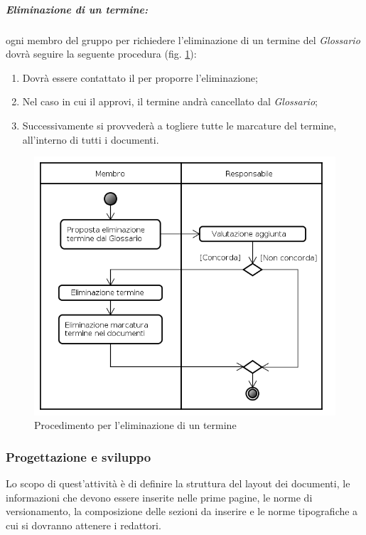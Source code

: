 \subparagraph{Eliminazione di un termine:}
ogni membro del gruppo per richiedere l'eliminazione di un termine del \emph{Glossario} dovrà seguire la seguente procedura (fig. \ref{proc_eliminazione}):
\begin{enumerate}
\item Dovrà essere contattato il \projectManager{} per proporre l'eliminazione;
\item Nel caso in cui il \projectManager{} approvi, il termine andrà cancellato dal \emph{Glossario};
\item Successivamente si provvederà a togliere tutte le marcature del termine, all'interno di tutti i documenti.
\end{enumerate}
\pagebreak
\begin{figure}[!h]
\centering
\includegraphics [scale=0.5]{./content/Immagini/Eliminazione_Termine.png}
\caption{Procedimento per l'eliminazione di un termine}
\label{proc_eliminazione}
\end{figure}

\subsubsection{Progettazione e sviluppo}
\label{progettazionesviluppo}
Lo scopo di quest'attività è di definire la struttura del layout dei documenti, le informazioni che devono essere inserite nelle prime pagine, le norme di versionamento, la composizione delle sezioni da inserire e le norme tipografiche a cui si dovranno attenere i redattori.

